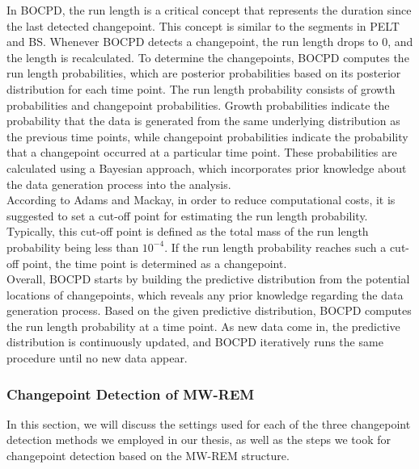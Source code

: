 \documentclass[]{interact}
\theoremstyle{plain}%
\theoremstyle{definition}
\theoremstyle{remark}
\begin{document}
	In BOCPD, the run length is a critical concept that represents the duration since the last detected changepoint. This concept is similar to the segments in PELT and BS. Whenever BOCPD detects a changepoint, the run length drops to 0, and the length is recalculated. To determine the changepoints, BOCPD computes the run length probabilities, which are posterior probabilities based on its posterior distribution for each time point. The run length probability consists of growth probabilities and changepoint probabilities. Growth probabilities indicate the probability that the data is generated from the same underlying distribution as the previous time points, while changepoint probabilities indicate the probability that a changepoint occurred at a particular time point. These probabilities are calculated using a Bayesian approach, which incorporates prior knowledge about the data generation process into the analysis. \\
	
	According to Adams and Mackay\cite{adamsBayesianOnlineChangepoint2007}, in order to reduce computational costs, it is suggested to set a cut-off point for estimating the run length probability. Typically, this cut-off point is defined as the total mass of the run length probability being less than $10^{-4}$. If the run length probability reaches such a cut-off point, the time point is determined as a changepoint. \\
	
	Overall, BOCPD starts by building the predictive distribution from the potential locations of changepoints, which reveals any prior knowledge regarding the data generation process. Based on the given predictive distribution, BOCPD computes the run length probability at a time point. As new data come in, the predictive distribution is continuously updated, and BOCPD iteratively runs the same procedure until no new data appear.
	
	\subsubsection{Changepoint Detection of MW-REM} \label{sec:our method}
	
	\hspace{0.27cm} In this section, we will discuss the settings used for each of the three changepoint detection methods we employed in our thesis, as well as the steps we took for changepoint detection based on the MW-REM structure. \\
	
\end{document}
